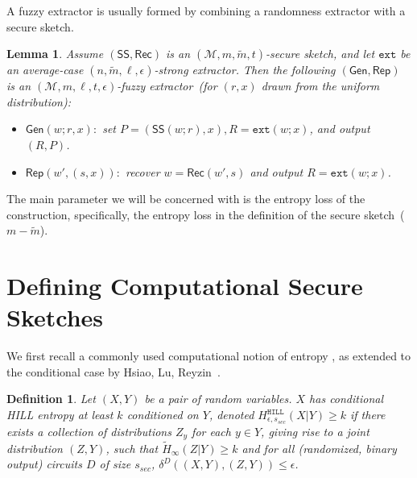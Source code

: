 \documentclass[11pt]{article}
\newcommand{\class}[1]{{\ensuremath{\mathsf{#1}}}}
\newcommand{\gen}{\ensuremath{\class{Gen}}\xspace}
\newcommand{\rep}{\ensuremath{\class{Rep}}\xspace}
\newcommand{\sketch}{\ensuremath{\class{SS}}\xspace}
\newcommand{\rec}{\ensuremath{\class{Rec}}\xspace}
\newcommand{\hill}{\ensuremath{\mathtt{HILL}}\xspace}
\newcommand{\ext}{\ensuremath{\mathtt{ext}}}
\newtheorem{lemma}[theorem]{Lemma}
\newtheorem{definition}[theorem]{Definition}
\begin{document}
A fuzzy extractor is usually formed by combining a randomness extractor with a secure sketch.
\begin{lemma}%
\label{lem:fuzzy ext construction}
Assume $(\sketch, \rec)$ is an $(\mathcal{M}, m, \tilde{m}, t)$-secure sketch, and let $\ext$ be an average-case $(n, \tilde{m}, \ell, \epsilon)$-strong extractor.  Then the following $(\gen, \rep)$ is an $(\mathcal{M}, m, \ell, t, \epsilon)$-fuzzy extractor~(for $(r, x)$ drawn from the uniform distribution):
\begin{itemize}
\item $\gen(w; r, x):$ set $P=(\sketch(w; r), x), R=\ext(w;x)$, and output $(R,P)$.
\item $\rep(w', (s, x)):$ recover $w=\rec(w',s)$ and output $R=\ext(w;x)$.
\end{itemize}
\end{lemma}
The main parameter we will be concerned with is the entropy loss of the construction, specifically, the entropy loss in the definition of the secure sketch~($m-\tilde{m}$).  %


\section{Defining Computational Secure Sketches}
\label{sec:defCompFuzzyExtractors}
We first recall a commonly used computational notion of entropy \cite{DBLP:journals/siamcomp/HastadILL99}, as extended to the conditional case by Hsiao, Lu, Reyzin~\cite{DBLP:conf/eurocrypt/HsiaoLR07}.

\begin{definition}
Let $(X, Y)$ be a pair of random variables.  $X$ has 
\emph{conditional HILL entropy} at least $k$ conditioned on $Y$,
denoted $H^{\hill}_{\epsilon, s_{sec}}(X|Y)\geq k$ if there exists a collection of
distributions $Z_y$ for each $y\in Y$, giving rise to a joint distribution
$(Z, Y)$, such that $\tilde{H}_\infty(Z|Y)\geq k$ and for all (randomized, binary output) circuits $D$ of size $s_{sec}$, $\delta^D((X, Y),(Z,Y))\leq \epsilon$.
\end{definition}
\end{document}

